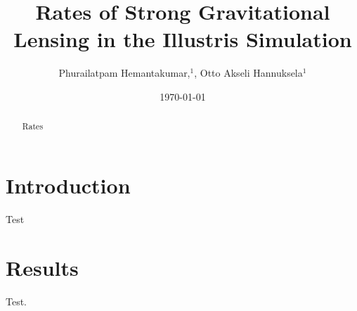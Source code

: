 \documentclass[aps,prd,twocolumn,superscriptaddress,groupedaddress,nofootinbib,showpacs,eqsecnum,useAms]{revtex4-1}
\begin{document}

\title{ 
Rates of Strong Gravitational Lensing in the Illustris Simulation
}

\author{Phurailatpam Hemantakumar,$^{1}$, Otto Akseli Hannuksela$^{1}$}

\date{\today}
\begin{abstract}
  Rates
\end{abstract}
  
\maketitle

\section{\label{sec:level1}Introduction}

Test 

\newpage

\section{Results}

Test.
\end{document}
